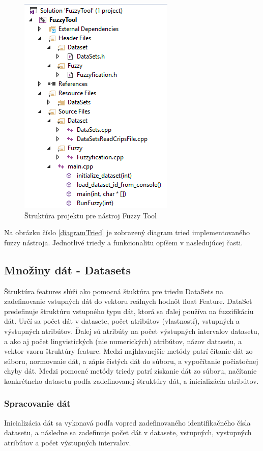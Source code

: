 \begin{figure}[h]
\includegraphics[]{obrazky/structure.PNG}
\centering
\caption{Štruktúra projektu pre nástroj Fuzzy Tool} 
\label{fig:structure}
\end{figure}


Na obrázku číslo \ref{diagramTried} je zobrazený diagram tried implementovaného fuzzy nástroja. Jednotlivé triedy a funkcionalitu opíšem v nasledujúcej časti. 


\subsection{Množiny dát - Datasets}
Štruktúra features slúži ako pomocná štuktúra pre triedu DataSets na zadefinovanie vstupných dát do vektoru reálnych hodnôt float Feature. DataSet predefinuje štruktúru vstupného typu dát, ktorá sa ďalej používa na fuzzifikáciu dát. Určí sa počet dát v datasete, počet atribútov (vlastností), vstupných a výstupných atribútov. Ďalej sú atribúty na počet výstupných intervalov datasetu, a ako aj počet lingvistických (nie numerických) atribútov, názov datasetu, a vektor vzoru štruktúry feature. Medzi najhlavnejšie metódy patrí čítanie dát zo súboru, normovnaie dát, a zápis čistých dát do súboru, a vypočítanie počiatočnej chyby dát. Medzi pomocné metódy triedy patrí získanie dát zo súboru, načítanie konkrétneho datasetu podľa zadefinovanej štruktúry dát, a inicializácia atribútov. 
\subsubsection{Spracovanie dát}
Inicializácia dát sa vykonavá podľa vopred zadefinovaného identifikačného čísla datasetu, a následne sa zadefinuje počet dát v datasete, vstupných, vystupných atribútov a počet výstupných intervalov. 

